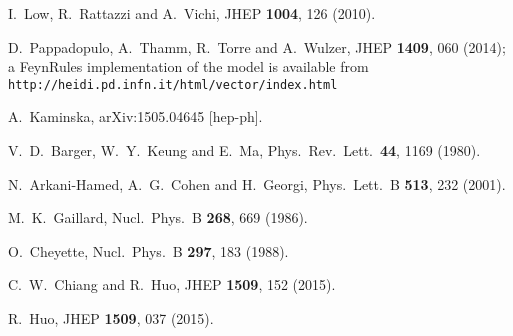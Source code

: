   I.~Low, R.~Rattazzi and A.~Vichi,
  JHEP {\bf 1004}, 126 (2010).

  D.~Pappadopulo, A.~Thamm, R.~Torre and A.~Wulzer,
  JHEP {\bf 1409}, 060 (2014); a FeynRules implementation
  of the model is available from 
  \texttt{http://heidi.pd.infn.it/html/vector/index.html}

  A.~Kaminska,
  arXiv:1505.04645 [hep-ph].

  V.~D.~Barger, W.~Y.~Keung and E.~Ma,
  Phys.\ Rev.\ Lett.\  {\bf 44}, 1169 (1980).

  N.~Arkani-Hamed, A.~G.~Cohen and H.~Georgi,
  Phys.\ Lett.\ B {\bf 513}, 232 (2001).
  
  M.~K.~Gaillard,
  Nucl.\ Phys.\ B {\bf 268}, 669 (1986).

  O.~Cheyette,
  Nucl.\ Phys.\ B {\bf 297}, 183 (1988).

  C.~W.~Chiang and R.~Huo,
  JHEP {\bf 1509}, 152 (2015).  

  R.~Huo,
  JHEP {\bf 1509}, 037 (2015).

